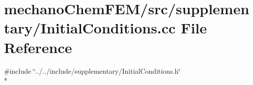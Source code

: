 \section{mechano\-Chem\-F\-E\-M/src/supplementary/\-Initial\-Conditions.cc File Reference}
\label{_initial_conditions_8cc}
{\ttfamily \#include \char`\"{}../../include/supplementary/\-Initial\-Conditions.\-h\char`\"{}}\\*
